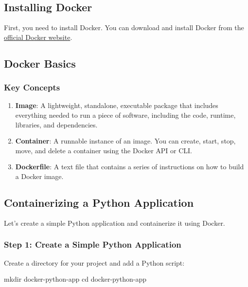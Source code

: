 \documentclass[
  letterpaper,
  DIV=11,
  numbers=noendperiod]{scrreprt}
\newenvironment{Shaded}{\begin{snugshade}}{\end{snugshade}}
\newcommand{\BuiltInTok}[1]{\textcolor[rgb]{0.00,0.23,0.31}{#1}}
\newcommand{\FunctionTok}[1]{\textcolor[rgb]{0.28,0.35,0.67}{#1}}
\newcommand{\NormalTok}[1]{\textcolor[rgb]{0.00,0.23,0.31}{#1}}
\providecommand{\tightlist}{%
  \setlength{\itemsep}{0pt}\setlength{\parskip}{0pt}}\usepackage{longtable,booktabs,array}
\begin{document}
\subsection{Installing Docker}\label{installing-docker}

First, you need to install Docker. You can download and install Docker
from the \href{https://www.docker.com/products/docker-desktop}{official
Docker website}.

\subsection{Docker Basics}\label{docker-basics}

\subsubsection{Key Concepts}\label{key-concepts-1}

\begin{enumerate}
\def\labelenumi{\arabic{enumi}.}
\tightlist
\item
  \textbf{Image}: A lightweight, standalone, executable package that
  includes everything needed to run a piece of software, including the
  code, runtime, libraries, and dependencies.
\item
  \textbf{Container}: A runnable instance of an image. You can create,
  start, stop, move, and delete a container using the Docker API or CLI.
\item
  \textbf{Dockerfile}: A text file that contains a series of
  instructions on how to build a Docker image.
\end{enumerate}

\subsection{Containerizing a Python
Application}\label{containerizing-a-python-application}

Let's create a simple Python application and containerize it using
Docker.

\subsubsection{Step 1: Create a Simple Python
Application}\label{step-1-create-a-simple-python-application}

Create a directory for your project and add a Python script:

\begin{Shaded}
\begin{Highlighting}[]
\FunctionTok{mkdir}\NormalTok{ docker{-}python{-}app}
\BuiltInTok{cd}\NormalTok{ docker{-}python{-}app}
\end{Highlighting}
\end{Shaded}
\end{document}
